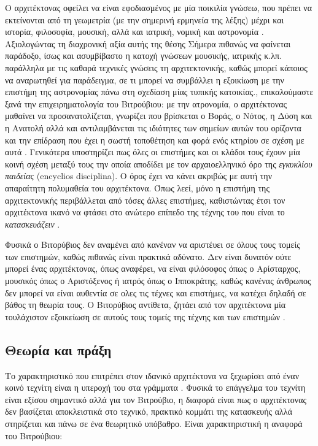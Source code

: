 Ο αρχιτέκτονας οφείλει να είναι εφοδιασμένος με μία ποικιλία γνώσεω, που πρέπει να εκτείνονται από τη γεωμετρία (με την σημερινή ερμηνεία της λέξης) μέχρι και ιστορία, φιλοσοφία, μουσική, αλλά και ιατρική, νομική και αστρονομία \cite[σ. 392]{masterson_status_2004}. Αξιολογώντας τη διαχρονική αξία αυτής της θέσης\sidenote%
    {Σήμερα πιθανώς να φαίνεται παράδοξο, ίσως και ασυμβίβαστο η   κατοχή γνώσεων μουσικής, ιατρικής κ.λπ. παράλληλα με τις καθαρά τεχνικές γνώσεις τη αρχιτεκτονικής, καθώς μπορεί κάποιος να αναρωτηθεί για παράδειγμα, σε τι μπορεί να συμβάλλει η εξοικίωση με
    την επιστήμη της αστρονομίας πάνω στη σχεδίαση μίας
    τυπικής κατοικίας.},
επικαλούμαστε ξανά την επιχειρηματολογία του Βιτρούβιου: με την ατρονομία, ο αρχιτέκτονας μαθαίνει να προσανατολίζεται, γνωρίζει που βρίσκεται ο Βοράς, ο Νότος, η Δύση και η Ανατολή αλλά και αντιλαμβάνεται τις ιδιότητες των σημείων αυτών του ορίζοντα και την επίδραση που έχει η σωστή τοποθέτηση και φορά ενός κτηρίου σε σχέση με αυτά \cite[σ. 43]{vitruvius-lefas}. Γενικότερα υποστηρίζει πως όλες οι επιστήμες και οι κλάδοι τους έχουν μία κοινή σχέση μεταξύ τους την οποία αποδίδει με τον αρχαιοελληνικό όρο της \emph{εγκυκλίου παιδείας} (encyclios disciplina). Ο όρος έχει να κάνει ακριβώς με αυτή την απαραίτητη πολυμαθεία του αρχιτέκτονα. Όπως λεεί, μόνο η επιστήμη της αρχιτεκτονικής περιβάλλεται από τόσες άλλες επιστήμες, καθιστώντας έτσι τον αρχιτέκτονα ικανό να φτάσει στο ανώτερο επίπεδο της τέχνης του που είναι το \emph{κατασκευάζειν} \cite[σ. 45]{vitruvius-lefas}.

Φυσικά ο Βιτορύβιος δεν αναμένει από κανέναν να αριστέυει σε όλους τους τομείς των επιστημών, καθώς πιθανώς είναι πρακτικά αδύνατο. Δεν είναι δυνατόν ούτε μπορεί ένας αρχιτέκτονας, όπως αναφέρει, να είναι φιλόσοφος όπως ο Αρίσταρχος, μουσικός όπως ο Αριστόξενος ή ιατρός όπως ο Ιπποκράτης, καθώς κανένας άνθρωπος δεν μπορεί να είναι αυθεντία σε ολες τις τέχνες και επιστήμες, να κατέχει δηλαδή σε βάθος τη θεωρία τους. Ο Βιτορύβιος αντίθετα, ζητάει από τον αρχιτέκτονα μία τουλάχιστον εξοικείωση σε αυτούς τους τομείς της τέχνης και των επιστημών \cite[σ.~45]{vitruvius-lefas}. 

\subsection{Θεωρία και πράξη}

Το χαρακτηριστικό που επιτρέπει στον  ιδανικό αρχιτέκτονα να ξεχωρίσει από έναν κοινό τεχνίτη είναι η υπεροχή του στα γράμματα \cite{masterson_status_2004}. Φυσικά το επάγγελμα του τεχνίτη είναι εξίσου σημαντικό αλλά για τον Βιτρούβιο, η διαφορά είναι πως ο αρχιτέκτονας δεν βασίζεται αποκλειστικά στο τεχνικό, πρακτικό κομμάτι της κατασκευής αλλά στηρίζεται και πάνω σε ένα θεωρητικό υπόβαθρο. Είναι χαρακτηριστική η αναφορά του Βιτρούβιου:

